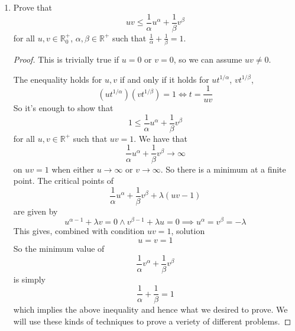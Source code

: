 \documentclass{article}
\newcommand{\reals}[0]{\mathbb{R}}
\begin{document}
\begin{enumerate}

  \item Prove that
  \begin{equation}uv \leq \frac{1}{\alpha}u^\alpha + \frac{1}{\beta}v^\beta\end{equation}
  for all \(u, v \in \reals^+_0\), \(\alpha, \beta \in \reals^+\) such that \(\frac{1}{\alpha} + \frac{1}{\beta} = 1\).
  \begin{proof}
    This is trivially true if \(u = 0\) or \(v = 0\), so we can assume \(uv \neq 0\).

    The enequality holds for \(u, v\) if and only if it holds for \(ut^{1/\alpha}\), \(vt^{1/\beta}\),
    \begin{equation}(ut^{1/\alpha})(vt^{1/\beta}) = 1 \iff t = \frac{1}{uv}\end{equation}
    So it's enough to show that
    \begin{equation}1 \leq \frac{1}{\alpha}u^{\alpha} + \frac{1}{\beta}v^{\beta}\end{equation}
    for all \(u, v \in \reals^+\) such that \(uv = 1\).
    We have that
    \begin{equation}\frac{1}{\alpha}u^\alpha + \frac{1}{\beta}v^\beta \to \infty\end{equation}
    on \(uv = 1\) when either \(u \to \infty\) or \(v \to \infty\). So there is a minimum at a finite point.
    The critical points of
    \begin{equation}\frac{1}{\alpha}u^\alpha + \frac{1}{\beta}v^\beta + \lambda(uv - 1)\end{equation}
    are given by
    \begin{equation}u^{\alpha - 1} + \lambda v = 0 \land v^{\beta - 1} + \lambda u = 0 \implies u^\alpha = v^\beta = -\lambda\end{equation}
    This gives, combined with condition \(uv = 1\), solution
    \begin{equation}u = v = 1\end{equation}
    So the minimum value of
    \begin{equation}\frac{1}{\alpha}v^\alpha + \frac{1}{\beta}v^\beta\end{equation}
    is simply
    \begin{equation}\frac{1}{\alpha} + \frac{1}{\beta} = 1\end{equation}
    which implies the above inequality and hence what we desired to prove. We will use these kinds of techniques to prove a veriety of different problems.
  \end{proof}


\end{enumerate}
\end{document}
